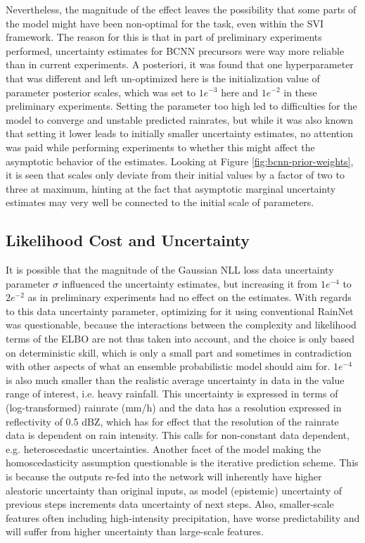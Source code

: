 Nevertheless, the magnitude of the effect leaves the possibility that some parts of the model might have been non-optimal for the task, even within the SVI framework. The reason for this is that in part of preliminary experiments performed, uncertainty estimates for BCNN precursors were way more reliable than in current experiments. A posteriori, it was found that one hyperparameter that was different and left un-optimized here is the initialization value of parameter posterior scales, which was set to $1e^{-3}$ here and $1e^{-2}$ in these preliminary experiments. Setting the parameter too high led to difficulties for the model to converge and unstable predicted rainrates, but while it was also known that setting it lower leads to initially smaller uncertainty estimates, no attention was paid while performing experiments to whether this might affect the asymptotic behavior of the estimates. Looking at Figure \ref{fig:bcnn-prior-weights}, it is seen that scales only deviate from their initial values by a factor of two to three at maximum, hinting at the fact that asymptotic marginal uncertainty estimates may very well be connected to the initial scale of parameters. 

\subsection{Likelihood Cost and Uncertainty}

It is possible that the magnitude of the Gaussian NLL loss data uncertainty parameter $\sigma$ influenced the uncertainty estimates, but increasing it from $1e^{-4}$ to $2e^{-2}$ as in preliminary experiments had no effect on the estimates. 
With regards to this data uncertainty parameter, optimizing for it using conventional RainNet was questionable, because the interactions between the complexity and likelihood terms of the ELBO are not thus taken into account, and the choice is only based on deterministic skill, which is only a small part and sometimes in contradiction with other aspects of what an ensemble probabilistic model should aim for. $1e^{-4}$ is also much smaller than the realistic average uncertainty in data in the value range of interest, i.e. heavy rainfall. This uncertainty is expressed in terms of (log-transformed) rainrate (mm/h) and the data has a resolution expressed in reflectivity of 0.5 dBZ, which has for effect that the resolution of the rainrate data is dependent on rain intensity. This calls for non-constant data dependent, e.g. heteroscedastic uncertainties. Another facet of the model making the homoscedasticity assumption questionable is the iterative prediction scheme. This is because the outputs re-fed into the network will inherently have higher aleatoric uncertainty than original inputs, as model (epistemic) uncertainty of previous steps increments data uncertainty of next steps. Also, smaller-scale features often including high-intensity precipitation, have worse predictability and will suffer from higher uncertainty than large-scale features.

